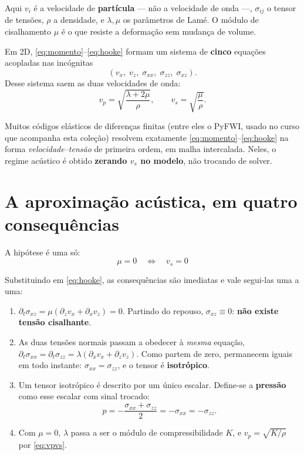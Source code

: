 \documentclass[11pt,a4paper,oneside]{report}
\begin{document}
Aqui $v_i$ \'e a velocidade de \textbf{part\'icula} --- n\~ao a velocidade de
onda ---, $\sigma_{ij}$ o tensor de tens\~oes, $\rho$ a densidade, e
$\lambda, \mu$ os par\^ametros de Lam\'e. O m\'odulo de cisalhamento $\mu$ \'e
o que resiste a deforma\c{c}\~ao sem mudan\c{c}a de volume.

Em 2D, \eqref{eq:momento}--\eqref{eq:hooke} formam um sistema de
\textbf{cinco} equa\c{c}\~oes acopladas nas inc\'ognitas
\[
(v_x,\; v_z,\; \sigma_{xx},\; \sigma_{zz},\; \sigma_{xz}).
\]
Desse sistema saem as duas velocidades de onda:
\begin{equation}
v_p = \sqrt{\frac{\lambda + 2\mu}{\rho}},
\qquad
v_s = \sqrt{\frac{\mu}{\rho}} .
\label{eq:vpvs}
\end{equation}

\begin{pratica}
Muitos c\'odigos el\'asticos de diferen\c{c}as finitas (entre eles o PyFWI,
usado no curso que acompanha esta cole\c{c}\~ao) resolvem exatamente
\eqref{eq:momento}--\eqref{eq:hooke} na forma \emph{velocidade--tens\~ao} de
primeira ordem, em malha intercalada. Neles, o regime ac\'ustico \'e obtido
\textbf{zerando $v_s$ no modelo}, n\~ao trocando de solver.
\end{pratica}

\section{A aproxima\c{c}\~ao ac\'ustica, em quatro consequ\^encias}

A hip\'otese \'e uma s\'o:
\begin{equation}
\boxed{\;\mu = 0 \quad \Longleftrightarrow \quad v_s = 0\;}
\label{eq:hipotese}
\end{equation}

Substituindo em \eqref{eq:hooke}, as consequ\^encias s\~ao imediatas e vale
segui-las uma a uma:

\begin{enumerate}[leftmargin=*]
\item $\partial_t\sigma_{xz} = \mu(\partial_z v_x + \partial_x v_z) = 0$.
Partindo do repouso, $\sigma_{xz} \equiv 0$: \textbf{n\~ao existe tens\~ao
cisalhante}.
\item As duas tens\~oes normais passam a obedecer \`a \emph{mesma}
equa\c{c}\~ao,
$\partial_t\sigma_{xx} = \partial_t\sigma_{zz}
 = \lambda(\partial_x v_x + \partial_z v_z)$. Como partem de zero, permanecem
iguais em todo instante: $\sigma_{xx} = \sigma_{zz}$, e o tensor \'e
\textbf{isotr\'opico}.
\item Um tensor isotr\'opico \'e descrito por um \'unico escalar. Define-se a
\textbf{press\~ao} como esse escalar com sinal trocado:
\begin{equation}
p = -\frac{\sigma_{xx} + \sigma_{zz}}{2} = -\sigma_{xx} = -\sigma_{zz}.
\label{eq:pressao}
\end{equation}
\item Com $\mu = 0$, $\lambda$ passa a ser o m\'odulo de compressibilidade
$K$, e $v_p = \sqrt{K/\rho}$ por \eqref{eq:vpvs}.
\end{enumerate}
\end{document}
